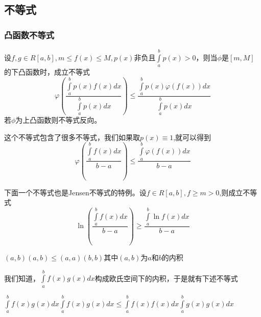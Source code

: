 \documentclass[lang=cn,10pt]{elegantbook}
\begin{document}
\subsection{不等式}
\subsubsection{凸函数不等式}
\begin{proposition}[Jensen不等式]
	设$f,g\in R[a,b],m\le f(x)\le M,p(x)$非负且$\int\limits_a^b{p\left( x \right)}>0$，则当$\phi$是$[m,M]$的下凸函数时，成立不等式
	\begin{equation*}
		\varphi \left( \frac{\int\limits_a^b{p\left( x \right) f\left( x \right) dx}}{\int\limits_a^b{p\left( x \right) dx}} \right) \le \frac{\int\limits_a^b{p\left( x \right) \varphi \left( f\left( x \right) \right) dx}}{\int\limits_a^b{p\left( x \right) dx}}
	\end{equation*}
	若$\phi$为上凸函数则不等式反向。
\end{proposition}
这个不等式包含了很多不等式，我们如果取$p(x)\equiv 1$,就可以得到
\begin{equation*}
	\varphi \left( \frac{\int\limits_a^b{f\left( x \right) dx}}{b-a} \right) \le \frac{\int\limits_a^b{\varphi \left( f\left( x \right) \right) dx}}{b-a}
\end{equation*}

下面一个不等式也是Jensen不等式的特例。设$f\in R[a,b],f\ge m >0$,则成立不等式
\begin{equation*}
	\ln \left( \frac{\int\limits_a^b{f\left( x \right) dx}}{b-a} \right) \ge \frac{\int\limits_a^b{\ln f\left( x \right) dx}}{b-a}
\end{equation*}
\begin{proposition}[Schwarz不等式]
	$(a,b)(a,b)\le (a,a)(b,b)$其中$(a,b)$为$a$和$b$的内积
\end{proposition}
我们知道，$\int\limits_a^b{f\left( x \right) g\left( x \right) dx}$构成欧氏空间下的内积，于是就有下述不等式
\begin{corollary}[Schwarz不等式的积分推广]
	$\int\limits_a^b{f\left( x \right) g\left( x \right) dx}\int\limits_a^b{f\left( x \right) g\left( x \right) dx}\le \int\limits_a^b{f\left( x \right) f\left( x \right) dx}\int\limits_a^b{g\left( x \right) g\left( x \right) dx}$
\end{corollary}
\end{document}
